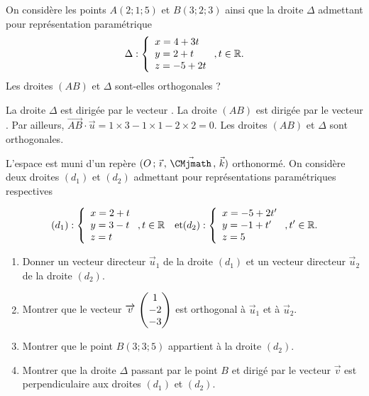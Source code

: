 \documentclass[11pt,fleqn, openany]{book} %
\begin{document}
 

\begin{exercise}[topic=geom13]On considère les points $A(2;1;5)$ et $B(3;2;3)$ ainsi que la droite $\Delta$ admettant pour représentation paramétrique \[ \Delta : \left\{\renewcommand{\arraystretch}{1}\renewcommand{\arraystretch}{1}\begin{array}{l} x = 4 +3t \\ y = 2+t \\ z = -5+2t 

\end{array}\right. , t\in \mathbb{R}.\] Les droites $(AB)$ et $\Delta$ sont-elles orthogonales ?\end{exercise}

\begin{solution}La droite $\Delta$ est dirigée par le vecteur . La droite $(AB)$ est dirigée par le vecteur . Par ailleurs, $\overrightarrow{AB}\cdot \vec u = 1 \times 3 - 1 \times 1  -2 \times 2 = 0$. Les droites $(AB)$ et $\Delta$ sont orthogonales.\end{solution}


\begin{exercise}[topic=geom13]L'espace est muni d'un repère $\Oijk$ orthonormé. On considère deux droites $(d_1)$ et $(d_2)$ admettant pour représentations paramétriques respectives

\[ (d_1) : \left\{ \renewcommand{\arraystretch}{1}\renewcommand{\arraystretch}{1}\begin{array}{l}x=2+t \\ y=3-t \\ z=t \end{array}\right.,t \in \mathbb{R} \quad \text{et} (d_2) : \left\{ \renewcommand{\arraystretch}{1}\renewcommand{\arraystretch}{1}\begin{array}{l}x=-5+2t' \\ y=-1+t' \\ z=5 \end{array}\right.,t' \in \mathbb{R}.\]

\begin{enumerate}
\item Donner un vecteur directeur $\vec u_1$ de la droite $(d_1)$ et un vecteur directeur $\vec u_2$ de la droite $(d_2)$.
\item Montrer que le vecteur $\coorde{v}{1}{-2}{-3}$ est orthogonal à $\vec u_1$ et à $\vec u_2$.
\item Montrer que le point $B(3;3;5)$ appartient à la droite $(d_2)$.
\item Montrer que la droite $\Delta$ passant par le point $B$ et dirigé par le vecteur $\vec v$ est perpendiculaire aux droites $(d_1)$ et $(d_2)$.
\end{enumerate}\end{exercise}
\end{document}
